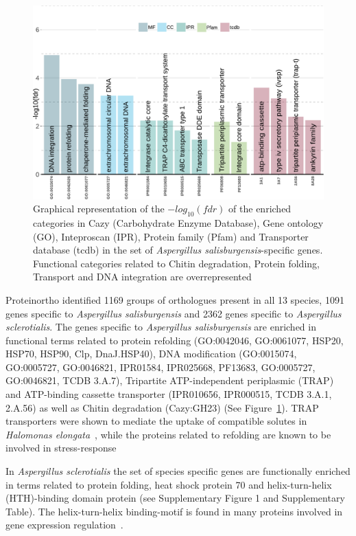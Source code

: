\documentclass[jof,article,submit,moreauthors,pdftex,10pt,a4paper]{Definitions/mdpi}
\newcommand{\phiSp}{\textit{Aspergillus salisburgensis}}
\newcommand{\phiScl}{\textit{Aspergillus sclerotialis}}
\begin{document}
\begin{figure}[htbp]
    \centering
    \includegraphics[width=\linewidth]{toPlot_specificToPhiSp.pdf}
    \caption{Graphical representation of the $-log_{10}(fdr)$ of the enriched categories in Cazy (Carbohydrate Enzyme Database), Gene ontology (GO), Inteproscan (IPR), Protein family (Pfam) and Transporter database (tcdb) in the set of {\phiSp}-specific genes. Functional categories related to Chitin degradation, Protein folding, Transport and DNA integration are overrepresented}
    \label{fig:spec}
\end{figure}


Proteinortho identified 1169 groups of orthologues present in all 13 species, 1091 genes specific to \phiSp{} and 2362 genes specific to \phiScl{}. The genes specific to \phiSp{} are enriched in functional terms related to protein refolding (GO:0042046, GO:0061077, HSP20, HSP70, HSP90, Clp, DnaJ.HSP40), DNA modification (GO:0015074, GO:0005727, GO:0046821, IPR01584, IPR025668, PF13683, GO:0005727, GO:0046821, TCDB 3.A.7), Tripartite ATP-independent periplasmic (TRAP) and ATP-binding cassette transporter (IPR010656, IPR000515, TCDB 3.A.1, 2.A.56) as well as  Chitin degradation (Cazy:GH23) (See Figure~\ref{fig:spec}). TRAP transporters were shown to mediate the uptake of compatible solutes in \textit{Halomonas elongata}~\cite{Grammann2002}, while the proteins related to refolding are known to be involved in stress-response~\cite{Verghese2012}  


In \phiScl{} the set of species specific genes are functionally enriched in terms related to protein folding, heat shock protein 70 and helix-turn-helix (HTH)-binding domain protein (see Supplementary Figure 1 and Supplementary Table).  The helix-turn-helix binding-motif is found in many proteins involved in gene expression regulation~\cite{Brennan1989}. 
\end{document}
